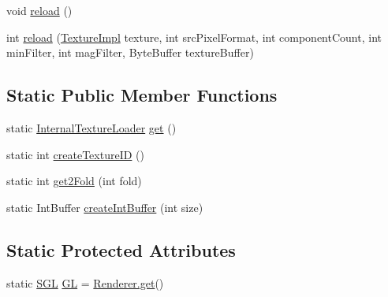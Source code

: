 \begin{DoxyCompactItemize}
\item 
void \mbox{\hyperlink{classorg_1_1newdawn_1_1slick_1_1opengl_1_1_internal_texture_loader_a104bc76d2e57c583fb713651a08f69a1}{reload}} ()
\item 
int \mbox{\hyperlink{classorg_1_1newdawn_1_1slick_1_1opengl_1_1_internal_texture_loader_a027f068ce42f53062f37140d09204d6e}{reload}} (\mbox{\hyperlink{classorg_1_1newdawn_1_1slick_1_1opengl_1_1_texture_impl}{Texture\+Impl}} texture, int src\+Pixel\+Format, int component\+Count, int min\+Filter, int mag\+Filter, Byte\+Buffer texture\+Buffer)
\end{DoxyCompactItemize}
\subsection*{Static Public Member Functions}
\begin{DoxyCompactItemize}
\item 
static \mbox{\hyperlink{classorg_1_1newdawn_1_1slick_1_1opengl_1_1_internal_texture_loader}{Internal\+Texture\+Loader}} \mbox{\hyperlink{classorg_1_1newdawn_1_1slick_1_1opengl_1_1_internal_texture_loader_a01691a541caf71ca7f1daeac7defea02}{get}} ()
\item 
static int \mbox{\hyperlink{classorg_1_1newdawn_1_1slick_1_1opengl_1_1_internal_texture_loader_a1bebab39014659d66c3f45bfefb678a1}{create\+Texture\+ID}} ()
\item 
static int \mbox{\hyperlink{classorg_1_1newdawn_1_1slick_1_1opengl_1_1_internal_texture_loader_ae9aa071a4fa98cbc080f7d0ad9423ae1}{get2\+Fold}} (int fold)
\item 
static Int\+Buffer \mbox{\hyperlink{classorg_1_1newdawn_1_1slick_1_1opengl_1_1_internal_texture_loader_a395abad35456c2a752fbca089d209981}{create\+Int\+Buffer}} (int size)
\end{DoxyCompactItemize}
\subsection*{Static Protected Attributes}
\begin{DoxyCompactItemize}
\item 
static \mbox{\hyperlink{interfaceorg_1_1newdawn_1_1slick_1_1opengl_1_1renderer_1_1_s_g_l}{S\+GL}} \mbox{\hyperlink{classorg_1_1newdawn_1_1slick_1_1opengl_1_1_internal_texture_loader_a302f0e97810ce583189425dd693ae4c2}{GL}} = \mbox{\hyperlink{classorg_1_1newdawn_1_1slick_1_1opengl_1_1renderer_1_1_renderer_abe742c3a7dfca67c6c01821d27087308}{Renderer.\+get}}()
\end{DoxyCompactItemize}
